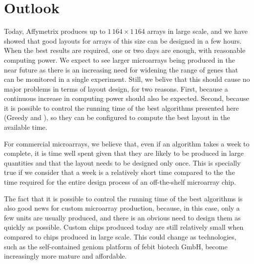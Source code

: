 \section{Outlook}
\label{sec:discuss_outlook}

Today, Affymetrix produces up to $1\,164\times 1\,164$ arrays in large scale,
and we have showed that good layouts for arrays of this size can be designed in
a few hours. When the best results are required, one or two days are enough,
with reasonable computing power. We expect to see larger microarrays being
produced in the near future as there is an increasing need for widening the
range of genes that can be monitored in a single experiment. Still, we belive
that this should cause no major problems in terms of layout design, for two
reasons. First, because a continuous increase in computing power should also be
expected. Second, because it is possible to control the running time of the best
algorithms presented here (Greedy and \Greedyplus), so they can be configured to
compute the best layout in the available time. 

For commercial microarrays, we believe that, even if an algorithm takes a week
to complete, it is time well spent given that they are likely to be produced in
large quantities and that the layout needs to be designed only once. This is
specially true if we consider that a week is a relatively short time compared to
the the time required for the entire design process of an off-the-shelf
microarray chip.

The fact that it is possible to control the running time of the best algorithms
is also good news for custom microarray production, because, in this case, only
a few units are usually produced, and there is an obvious need to design them as
quickly as possible. Custom chips produced today are still relatively small when
compared to chips produced in large scale. This could change as
technologies, such as the self-contained {\sffamily geniom} platform of febit
biotech GmbH, become increasingly more mature and affordable.
